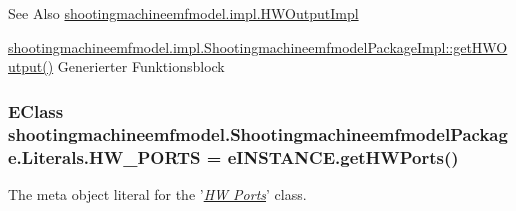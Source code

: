 \begin{DoxySeeAlso}{See Also}
\hyperlink{classshootingmachineemfmodel_1_1impl_1_1_h_w_output_impl}{shootingmachineemfmodel.\-impl.\-H\-W\-Output\-Impl} 

\hyperlink{classshootingmachineemfmodel_1_1impl_1_1_shootingmachineemfmodel_package_impl_ab435e9978a57a6482d01ba48fa8ca439}{shootingmachineemfmodel.\-impl.\-Shootingmachineemfmodel\-Package\-Impl\-::get\-H\-W\-Output()} Generierter Funktionsblock 
\end{DoxySeeAlso}
\hypertarget{interfaceshootingmachineemfmodel_1_1_shootingmachineemfmodel_package_1_1_literals_a240205c41ebf9293870a8a32fb0650c1}{
\subsubsection[{H\-W\-\_\-\-P\-O\-R\-T\-S}]{\setlength{\rightskip}{0pt plus 5cm}E\-Class shootingmachineemfmodel.\-Shootingmachineemfmodel\-Package.\-Literals.\-H\-W\-\_\-\-P\-O\-R\-T\-S = e\-I\-N\-S\-T\-A\-N\-C\-E.\-get\-H\-W\-Ports()}}\label{interfaceshootingmachineemfmodel_1_1_shootingmachineemfmodel_package_1_1_literals_a240205c41ebf9293870a8a32fb0650c1}
The meta object literal for the '\hyperlink{classshootingmachineemfmodel_1_1impl_1_1_h_w_ports_impl}{{\itshape H\-W Ports}}' class.

